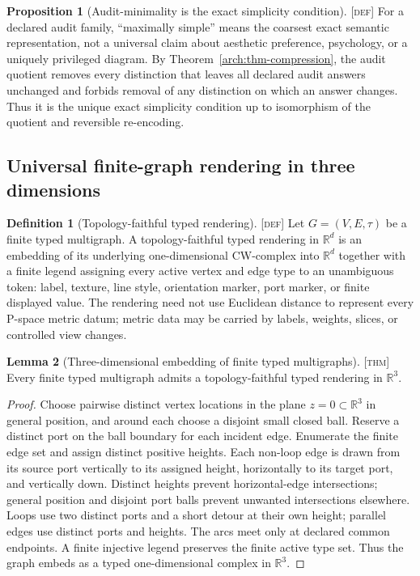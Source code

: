 \documentclass[11pt]{article}
\newcommand{\Defn}{\textsc{[def]}}
\newcommand{\Thm}{\textsc{[thm]}}
\theoremstyle{definition}
\newtheorem{sdefinition}{Definition}
\newtheorem{sproposition}{Proposition}
\newtheorem{slemma}[sdefinition]{Lemma}
\begin{document}
\begin{sproposition}[Audit-minimality is the exact simplicity condition]
\label{arch:prop-exact-simplicity}
\Defn{} For a declared audit family, ``maximally simple'' means the coarsest exact
semantic representation, not a universal claim about aesthetic preference,
psychology, or a uniquely privileged diagram. By
Theorem~\ref{arch:thm-compression}, the audit quotient removes every distinction
that leaves all declared audit answers unchanged and forbids removal of any
distinction on which an answer changes. Thus it is the unique exact simplicity
condition up to isomorphism of the quotient and reversible re-encoding.
\end{sproposition}


\subsection{Universal finite-graph rendering in three dimensions}

\begin{sdefinition}[Topology-faithful typed rendering]
\label{arch:def-rendering}
\Defn{} Let $G=(V,E,\tau)$ be a finite typed multigraph. A topology-faithful typed
rendering in $\mathbb R^d$ is an embedding of its underlying one-dimensional
CW-complex into $\mathbb R^d$ together with a finite legend assigning every active
vertex and edge type to an unambiguous token: label, texture, line style,
orientation marker, port marker, or finite displayed value. The rendering need not
use Euclidean distance to represent every P-space metric datum; metric data may be
carried by labels, weights, slices, or controlled view changes.
\end{sdefinition}

\begin{slemma}[Three-dimensional embedding of finite typed multigraphs]
\label{arch:lem-r3-embedding}
\Thm{} Every finite typed multigraph admits a topology-faithful typed rendering in
$\mathbb R^3$.
\end{slemma}

\begin{proof}
Choose pairwise distinct vertex locations in the plane $z=0\subset\mathbb R^3$ in
general position, and around each choose a disjoint small closed ball. Reserve a
distinct port on the ball boundary for each incident edge. Enumerate the finite edge
set and assign distinct positive heights. Each non-loop edge is drawn from its
source port vertically to its assigned height, horizontally to its target port, and
vertically down. Distinct heights prevent horizontal-edge intersections; general
position and disjoint port balls prevent unwanted intersections elsewhere. Loops
use two distinct ports and a short detour at their own height; parallel edges use
distinct ports and heights. The arcs meet only at declared common endpoints. A
finite injective legend preserves the finite active type set. Thus the graph embeds
as a typed one-dimensional complex in $\mathbb R^3$.
\end{proof}
\end{document}
